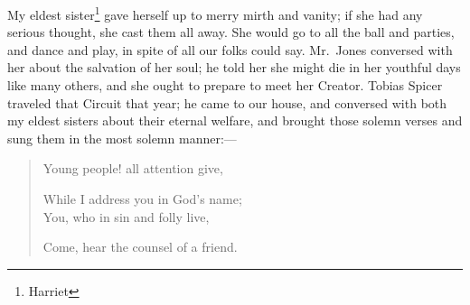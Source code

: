 My eldest sister\footnote{Harriet} gave herself up to merry mirth and vanity; if she had any serious thought, she cast them all away.
She would go to all the ball and parties, and dance and play, in spite of all our folks could say.
Mr.\ Jones conversed with her about the salvation of her soul; he told her she might die in her youthful days like many others, and she ought to prepare to meet her Creator.
Tobias Spicer traveled that Circuit that year; he came to our house, and conversed with both my eldest sisters about their eternal welfare, and brought those solemn verses and sung them in the most solemn manner:---
\begin{quote}
\setlength{\parindent}{2ex}
    Young people! all attention give,
    \setlength{\parskip}{0pt}
    \par While I address you in God's name;\\
    You, who in sin and folly live,
    \par Come, hear the counsel of a friend.
\end{quote}

